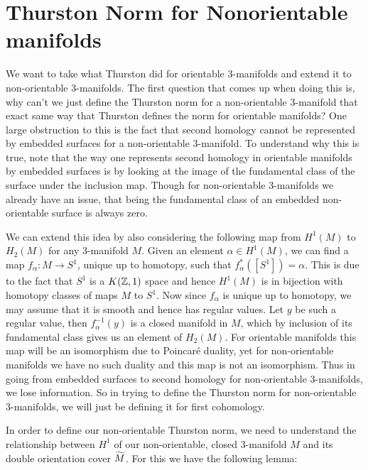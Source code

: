 \section{Thurston Norm for Nonorientable manifolds}

We want to take what Thurston did for orientable 3-manifolds and extend it to non-orientable 3-manifolds. The first question that comes up when doing this is, why can't we just define the Thurston norm for a non-orientable 3-manifold that exact same way that Thurston defines the norm for orientable manifolds? One large obstruction to this is the fact that second homology cannot be represented by embedded surfaces for a non-orientable 3-manifold. To understand why this is true, note that the way one represents second homology in orientable manifolds by embedded surfaces is by looking at the image of the fundamental class of the surface under the inclusion map. Though for non-orientable 3-manifolds we already have an issue, that being the fundamental class of an embedded non-orientable surface is always zero. 

We can extend this idea by also considering the following map from $H^1(M)$ to $H_2(M)$ for any 3-manifold $M$. Given an element $\alpha \in H^1(M)$, we can find a map $f_\alpha: M \xrightarrow[]{} S^1$, unique up to homotopy, such that $f_\alpha^*([S^1]) = \alpha$. This is due to the fact that $S^1$ is a $K(\mathbb{Z},1)$ space and hence $H^1(M)$ is in bijection with homotopy classes of maps $M$ to $S^1$. Now since $f_\alpha$ is unique up to homotopy, we may assume that it is smooth and hence has regular values. Let $y$ be such a regular value, then $f_\alpha^{-1}(y)$ is a closed manifold in $M$, which by inclusion of its fundamental class gives us an element of $H_2(M)$. For orientable manifolds this map will be an isomorphism due to Poincar\'e duality, yet for non-orientable manifolds we have no such duality and this map is not an isomorphism. Thus in going from embedded surfaces to second homology for non-orientable 3-manifolds, we lose information. So in trying to define the Thurston norm for non-orientable 3-manifolds, we will just be defining it for first cohomology. 

In order to define our non-orientable Thurston norm, we need to understand the relationship between $H^1$ of our non-orientable, closed 3-manifold $M$ and its double orientation cover $\widetilde{M}$. For this we have the following lemma:


